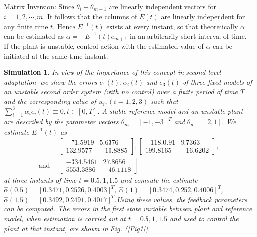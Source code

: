 \documentclass[conference]{IEEEtran}
\newtheorem{Simulation}{Simulation}
\begin{document}
{\large \underline{Matrix Inversion}}: Since $\theta_{i}-\theta_{m+1}$ are linearly independent vectors for $i=1,2,\cdots,m$. It follows that the columns of $E(t)$ are linearly independent for any finite time $t$. Hence $E^{-1}(t)$ exists at every instant, so that theoretically $\alpha$ can be estimated as $\alpha=-E^{-1}(t)e_{m+1}$ in an arbitrarily short interval of time. If the plant is unstable, control action with the estimated value of $\alpha$ can be initiated at the same time instant.

\begin{Simulation}

 In view of the importance of this concept in second level adaptation, we show the errors $e_{1}(t),e_{2}(t)$ and $e_{3}(t)$ of three fixed models of an unstable second order system (with no control) over a finite period of time $T$ and the corresponding value of $\alpha_{i},(i=1,2,3)$ such that $\sum_{i=1}^{3}\alpha_{i}e_{i}(t)\equiv0,t\in[0,T]$. A stable reference model and an unstable plant are described by the parameter vectors $\theta_{m}=[-1,-3]^{T}$ and $\theta_{p}=[2,1]$. We estimate $E^{-1}(t)$ as
\begin{equation}
\begin{split}
&\left[\begin{array}{ll} -71.5919 & 5.6376 \\ 132.9577 & -10.8885 \end{array}\right],\left[\begin{array}{ll} -118.0.91 & 9.7363 \\ 199.8165 & -16.6202 \end{array}\right],\\
 \ \text{and}\ \ &\left[\begin{array}{ll} -334.5461 & 27.8656 \\ 5553.3886 &  -46.1118 \end{array}\right]
 \end{split}
\end{equation}
at three instants of time $t=0.5,1,1.5$ and compute the estimate $\hat{\alpha}(0.5)=[0.3471,0.2526,0.4003]^{T}$, $\hat{\alpha}(1)=[0.3474,0.252,0.4006]^{T}$, $\hat{\alpha}(1.5)=[0.3492,0.2491,0.4017]^{T}$.Using these values, the feedback parameters can be computed. The errors in the first state variable between plant and reference model, when estimation is carried out at $t=0.5,1,1.5$ and used to control the plant at that instant, are shown in Fig. (\ref{Fig1}).
\end{Simulation}
\end{document}
